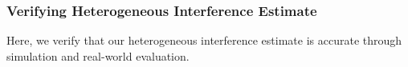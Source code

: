 \subsubsection{Verifying Heterogeneous Interference Estimate}
\label{sec:verifysigma}

Here, we verify that our heterogeneous interference estimate is accurate through simulation and real-world evaluation. 

%
%
%

